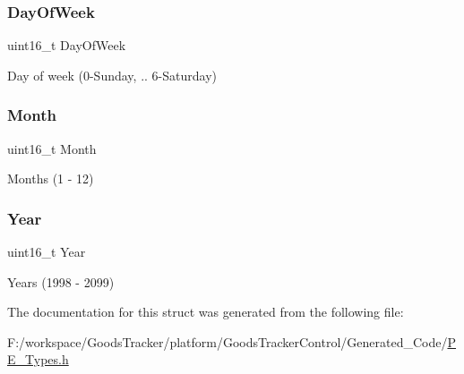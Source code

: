\subsubsection{\texorpdfstring{Day\+Of\+Week}{DayOfWeek}}
{\footnotesize\ttfamily uint16\+\_\+t Day\+Of\+Week}

Day of week (0-\/\+Sunday, .. 6-\/\+Saturday) \mbox{\label{struct_l_d_d___time_date___t_date_rec_ae1709c38acb314b2626a1efb4d132c93}} 
\subsubsection{\texorpdfstring{Month}{Month}}
{\footnotesize\ttfamily uint16\+\_\+t Month}

Months (1 -\/ 12) \mbox{\label{struct_l_d_d___time_date___t_date_rec_a5440b090b3d142031ea11ee8d350dc63}} 
\subsubsection{\texorpdfstring{Year}{Year}}
{\footnotesize\ttfamily uint16\+\_\+t Year}

Years (1998 -\/ 2099) 

The documentation for this struct was generated from the following file\+:\begin{DoxyCompactItemize}
\item 
F\+:/workspace/\+Goods\+Tracker/platform/\+Goods\+Tracker\+Control/\+Generated\+\_\+\+Code/\hyperlink{_p_e___types_8h}{P\+E\+\_\+\+Types.\+h}\end{DoxyCompactItemize}
